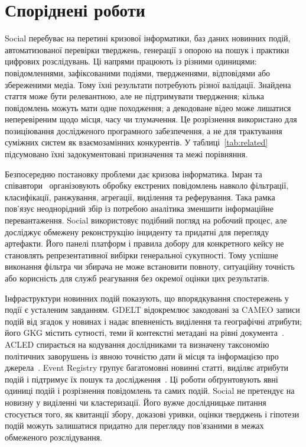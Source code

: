 \section{Споріднені роботи}
\label{sec:related}

Social перебуває на перетині кризової інформатики, баз даних новинних подій, автоматизованої перевірки тверджень, генерації з опорою на пошук і практики цифрових розслідувань. Ці напрями працюють із різними одиницями: повідомленнями, зафіксованими подіями, твердженнями, відповідями або збереженими медіа. Тому їхні результати потребують різної валідації. Знайдена стаття може бути релевантною, але не підтримувати твердження; кілька повідомлень можуть мати одне походження; а декодоване відео може лишатися неперевіреним щодо місця, часу чи тлумачення. Це розрізнення використано для позиціювання дослідженого програмного забезпечення, а не для трактування суміжних систем як взаємозамінних конкурентів. У таблиці~\ref{tab:related} підсумовано їхні задокументовані призначення та межі порівняння.

Безпосередню постановку проблеми дає кризова інформатика. Імран та співавтори~\cite{imran2015crisis} організовують обробку екстрених повідомлень навколо фільтрації, класифікації, ранжування, агрегації, виділення та реферування. Така рамка пов'язує неоднорідний збір із потребою аналітика зменшити інформаційне перевантаження. Social використовує подібний погляд на робочий процес, але досліджує обмежену реконструкцію інциденту та придатні для перегляду артефакти. Його панелі платформ і правила добору для конкретного кейсу не становлять репрезентативної вибірки генеральної сукупності. Тому успішне виконання фільтра чи збирача не може встановити повноту, ситуаційну точність або корисність для служб реагування без окремої оцінки цих результатів.

Інфраструктури новинних подій показують, що впорядкування спостережень у події є усталеним завданням. GDELT відокремлює закодовані за CAMEO записи подій від згадок у новинах і надає впевненість виділення та географічні атрибути; його GKG містить сутності, теми й контекстні метадані на рівні документа~\cite{gdelt2015events,gdelt2015gkg}. ACLED спирається на кодування дослідниками та визначену таксономію політичних заворушень із явною точністю дати й місця та інформацією про джерела~\cite{acledCodebook}. Event Registry групує багатомовні новинні статті, виділяє атрибути подій і підтримує їх пошук та дослідження~\cite{leban2014eventregistry}. Ці роботи обґрунтовують явні одиниці подій і розрізнення повідомлень та самих подій. Social не претендує на новизну у виділенні чи кластеризації. Його вужче дослідницьке питання стосується того, як квитанції збору, доказові уривки, оцінки тверджень і гіпотези подій можуть залишатися придатно для перегляду пов'язаними в межах обмеженого розслідування.

